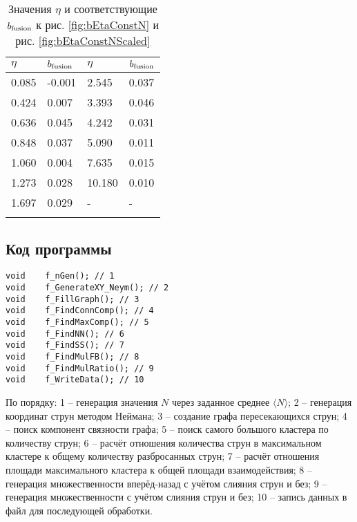 {\footnotesize
\begin{longtable}{| l | l || l | l |}
	\hline
	$\eta$	&	$b_{\textnormal{fusion}}$	&	$\eta$	&	$b_{\textnormal{fusion}}$	\\
	\hline
	0.085	&	-0.001	&	2.545	&	0.037	\\
	0.424	&	0.007	&	3.393	&	0.046	\\
	0.636	&	0.045	&	4.242	&	0.031	\\
	0.848	&	0.037	&	5.090	&	0.011	\\
	1.060	&	0.004	&	7.635	&	0.015	\\
	1.273	&	0.028	&	10.180	&	0.010	\\
	1.697	&	0.029	&	-		&	-	\\
	\hline
	\caption{Значения $\eta$ и соответствующие $b_{\textnormal{fusion}}$ к рис. \ref{fig:bEtaConstN} и рис. \ref{fig:bEtaConstNScaled}} \label{tab:bEtaConstN}
\end{longtable}}
\newpage
\subsection{Код программы}
\begin{lstlisting}
void	f_nGen(); // 1
void	f_GenerateXY_Neym(); // 2
void	f_FillGraph(); // 3
void	f_FindConnComp(); // 4
void	f_FindMaxComp(); // 5
void	f_FindNN(); // 6
void	f_FindSS(); // 7
void	f_FindMulFB(); // 8
void	f_FindMulRatio(); // 9
void	f_WriteData(); // 10
\end{lstlisting}
По порядку:  1 -- генерация значения $N$ через заданное среднее $\langle N \rangle$; 2 -- генерация координат струн методом Неймана; 3 -- создание графа пересекающихся струн; 4 -- поиск компонент связности графа; 5 -- поиск самого большого кластера по количеству струн; 6 -- расчёт отношения количества струн в максимальном кластере к общему количеству разбросанных струн; 7 -- расчёт отношения площади максимального кластера к общей площади взаимодействия; 8 -- генерация множественности вперёд-назад с учётом слияния струн и без; 9 -- генерация множественности с учётом слияния струн и без; 10 -- запись данных в файл для последующей обработки.

